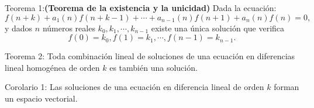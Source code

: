 \documentclass[spanish, utf8,handout]{beamer} %
\theoremstyle{definition}
\begin{document}
\begin{frame}
	\begin{block}{Teorema 1:{\bf (Teorema de la existencia y la unicidad)}}
		Dada la ecuación:
		$$
		f(n+k)+a_{1}(n)f(n+k-1)+\cdots+a_{n-1}(n)f(n+1)+a_{n}(n)f(n)=0,
		$$
		y dados $ n $ números reales $ k_{0},k_{1},\cdots,k_{n-1} $ existe una única solución que verifica 
		$$
		f(0)=k_{0},f(1)=k_{1},\cdots,f(n-1)=k_{n-1}.
		$$
	\end{block}
\begin{block}{Teorema 2:}
	Toda combinación lineal de soluciones de una ecuación en diferencias lineal homogénea de orden $ k $ es también una solución.
\end{block}
\begin{block}{Corolario 1:}
	Las soluciones de una ecuación en diferencia lineal de orden $ k $ forman un espacio vectorial.
\end{block}


\end{frame}




\end{document}
